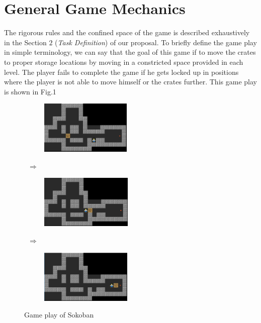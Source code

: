 \documentclass[10pt, final]{article}
\newcommand{\br}[1][.75]{\ \\[#1\baselineskip]}
\begin{document}
	\section{General Game Mechanics}
	The rigorous rules and the confined space of the game is described exhaustively in the Section $2$ (\textit{Task Definition}) of our proposal. To briefly define the game play in simple terminology, we can say that the goal of this game if to move the crates to proper storage locations by moving in a constricted space provided in each level. The player fails to complete the game if he gets locked up in positions where the player is not able to move himself or the crates further. This game play is shown in Fig.1 \br
	\begin{figure}[h!]
		\centering
		{
			\begin{subfigure}[h!]{1.7in}
				\includegraphics[height=1in]{pic1.png}
			\end{subfigure}
			~$\mathbf{\Longrightarrow}$~
			\begin{subfigure}[h!]{1.7in}
				\includegraphics[height=1in]{pic2.png}
			\end{subfigure}
			~$\mathbf{\Longrightarrow}$~
			\begin{subfigure}[h!]{1.7in}
				\includegraphics[height=1in]{pic3.png}
		\end{subfigure}}
		\caption{Game play of Sokoban}
		\label{fig:chain}
	\end{figure}
\end{document}
